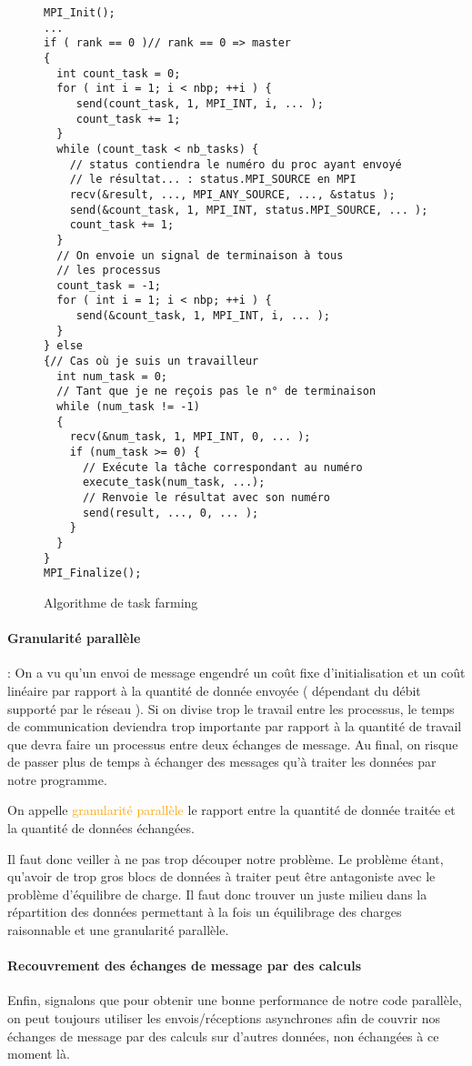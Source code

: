 \documentclass[fleqn,11pt]{article}
\begin{document}
\begin{figure}
\begin{lstlisting}
MPI_Init();
...
if ( rank == 0 )// rank == 0 => master
{
  int count_task = 0;
  for ( int i = 1; i < nbp; ++i ) {
     send(count_task, 1, MPI_INT, i, ... );     
     count_task += 1;
  }
  while (count_task < nb_tasks) {
    // status contiendra le numéro du proc ayant envoyé
    // le résultat... : status.MPI_SOURCE en MPI
    recv(&result, ..., MPI_ANY_SOURCE, ..., &status );
    send(&count_task, 1, MPI_INT, status.MPI_SOURCE, ... );     
    count_task += 1;    
  }
  // On envoie un signal de terminaison à tous
  // les processus
  count_task = -1;
  for ( int i = 1; i < nbp; ++i ) {
     send(&count_task, 1, MPI_INT, i, ... );     
  }  
} else
{// Cas où je suis un travailleur
  int num_task = 0;
  // Tant que je ne reçois pas le n° de terminaison
  while (num_task != -1)
  {
    recv(&num_task, 1, MPI_INT, 0, ... );
    if (num_task >= 0) {
      // Exécute la tâche correspondant au numéro
      execute_task(num_task, ...);
      // Renvoie le résultat avec son numéro 
      send(result, ..., 0, ... );
    }
  }
}
MPI_Finalize();
\end{lstlisting}
\caption{Algorithme de task farming}
\end{figure}

\paragraph{Granularité parallèle} : On a vu qu'un envoi de message engendré 
un coût fixe d'initialisation et un coût linéaire par rapport à la quantité
de donnée envoyée ( dépendant du débit supporté par le réseau ). Si on divise
trop le travail entre les processus, le temps de communication deviendra trop
importante par rapport à la quantité de travail que devra faire
un processus entre deux échanges de message. Au final, on risque de passer plus
 de temps à échanger des messages qu'à traiter les données par notre programme.
 
 On appelle \textcolor{orange}{granularité parallèle} le rapport entre la quantité de donnée traitée
 et la quantité de données échangées.
 
 Il faut donc veiller à ne pas trop découper notre problème. Le problème étant,
 qu'avoir de trop gros blocs de données à traiter peut être antagoniste avec
 le problème d'équilibre de charge. Il faut donc trouver un juste milieu
 dans la répartition des données permettant à la fois un équilibrage des
 charges raisonnable et une granularité parallèle.

\paragraph{Recouvrement des échanges de message par des calculs}

Enfin, signalons que pour obtenir une bonne performance de notre code parallèle,
on peut toujours utiliser les envois/réceptions asynchrones afin de couvrir
nos échanges de message par des calculs sur d'autres données, non échangées
à ce moment là.
\end{document}
